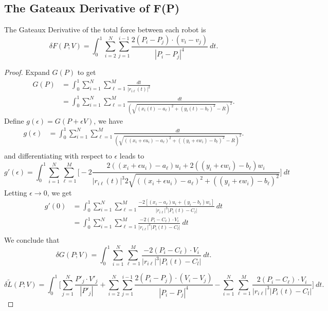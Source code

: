 \subsection{The Gateaux Derivative of F(P)}

\begin{prop}
    The Gateaux Derivative of the total force between each robot is
    \[  \delta F(P;V) = \int_{0}^{1} \sum_{i=2}^{N} \sum_{j=1}^{i-1} \frac{2(P_i - P_j) \cdot (v_i - v_j)}{| P_i - P_j|^4} \ dt. \]
\end{prop}
\begin{proof}
Expand \(G(P)\) to get 
\begin{align*} 
    G(P) &= \int_{0}^{1} \sum_{i=1}^{N}\sum_{\ell=1}^{M} \frac{dt}{|r_{i\ell}(t)|^2}  \\
         &= \int_{0}^{1} \sum_{i=1}^{N}\sum_{\ell=1}^{M} \frac{dt}{(\sqrt{(x_i(t) - a_{\ell})^2 + (y_i(t) - b_{\ell})^2} - R)^2}.
\end{align*}
Define \(g(\epsilon ) = G(P + \epsilon  V)\), we have
\begin{align*}
    g(\epsilon ) &= \int_{0}^{1} \sum_{i=1}^{N}\sum_{\ell=1}^{M} \frac{dt}{(\sqrt{((x_i + \epsilon  u_i)- a_{\ell})^2 + ((y_i + \epsilon  w_i) - b_{\ell})^2} - R)^2}. \\
\end{align*}
and differentiating with respect to \( \epsilon  \) leads to  
\[ 
g'(\epsilon ) = \int_{0}^{1}\sum_{i=1}^{N}\sum_{\ell=1}^{M} \Bigg[ -2\frac{ 2((x_i + \epsilon  u_i) - a_{\ell})u_i + 2((y_i + \epsilon  w_i) - b_{\ell})w_i}{|r_{i\ell}(t)|^3 2\sqrt{((x_i + \epsilon  u_i)- a_{\ell})^2 + ((y_i + \epsilon  w_i) - b_{\ell})^2}}  \Bigg] \ dt 
\]
Letting \( \epsilon  \to 0  \), we get 
\begin{align*}
    g'(0) &=  \int_{0}^{1} \sum_{i=1}^{N}\sum_{\ell=1}^{M} \frac{-2[(x_i - a_{\ell})u_i + (y_i - b_{\ell})w_i]}{ \big| r_{i\ell}\big|^3\big|P_i(t) - C_l \big|} \ dt \\
          &= \int_{0}^{1} \sum_{i=1}^{N}\sum_{\ell=1}^{M} \frac{ -2(P_i - C_{\ell}) \cdot V_i}{\big| r_{i\ell}\big|^3\big|P_i(t) - C_l \big| }\ dt \\
\end{align*}
We conclude that 
\[
\delta G(P;V) = \int_{0}^{1} \sum_{i=1}^{N}\sum_{\ell=1}^{M} \frac{ -2(P_i - C_{\ell}) \cdot V_i}{\big| r_{i\ell}\big|^3\big|P_i(t) - C_l \big| }\ dt.
\]


\[
 \delta \tilde{L} (P;V) = \int_{0}^{1} \bigg[ \sum_{j=1}^{N} \frac{P'_j \cdot V'_j}{|P'_j|} +\sum_{i=2}^{N} \sum_{j=1}^{i-1} \frac{2(P_i - P_j) \cdot (V_i - V_j)}{| P_i - P_j|^4} 
               - \sum_{i=1}^{N}\sum_{\ell=1}^{M} \frac{2(P_i - C_{\ell}) \cdot V_i}{\big| r_{i\ell}\big|^3\big|P_i(t) - C_l \big| } \bigg] \ dt.
\]
\end{proof}




